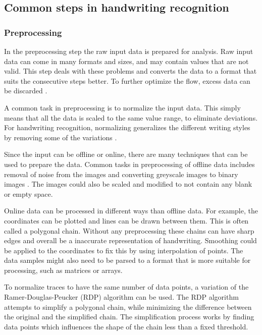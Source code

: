 \subsection{Common steps in handwriting recognition}

\subsubsection{Preprocessing}

In the preprocessing step the raw input data is prepared for analysis. Raw input data can come in many formats and sizes, and may contain values that are not valid. This step deals with these problems and converts the data to a format that suits the consecutive steps better. To further optimize the flow, excess data can be discarded \cite{huang_preprocessing_2007}.

A common task in preprocessing is to normalize the input data. This simply means that all the data is scaled to the same value range, to eliminate deviations. For handwriting recognition, normalizing generalizes the different writing styles by removing some of the variations \cite{huang_preprocessing_2007}.

Since the input can be offline or online, there are many techniques that can be used to prepare the data. Common tasks in preprocessing of offline data includes removal of noise from the images and converting greyscale images to binary images \cite{priya_online_2016}. The images could also be scaled and modified to not contain any blank or empty space.

Online data can be processed in different ways than offline data. For example, the coordinates can be plotted and lines can be drawn between them. This is often called a polygonal chain. Without any preprocessing these chains can have sharp edges and overall be a inaccurate representation of handwriting. Smoothing could be applied to the coordinates to fix this by using interpolation of points. The data samples might also need to be parsed to a format that is more suitable for processing, such as matrices or arrays.

To normalize traces to have the same number of data points, a variation of the Ramer-Douglas-Peucker (RDP) \cite{h_algorithms_2011} algorithm can be used. The RDP algorithm attempts to simplify a polygonal chain, while minimizing the difference between the original and the simplified chain. The simplification process works by finding data points which influences the shape of the chain less than a fixed threshold.

